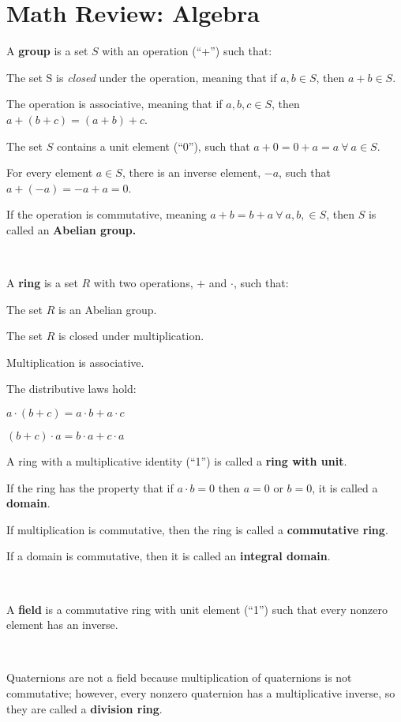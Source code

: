 \section{Math Review:  Algebra}

A {\bf group} is a set $S$ with an operation (``+'')  such that:

\qquad The set S is {\it closed} under the operation, meaning that if $a,b \in S$, then $a+b \in S$.

\qquad The operation is associative, meaning that if $a,b,c \in S$, then $a+(b+c) = (a+b)+c$.

\qquad The set $S$ contains a unit element (``0''), such that $a+0 = 0+a = a \ \forall \ a \in S.$

\qquad For every element $a \in S$, there is an inverse element, $-a$, such that $a+(-a) = -a + a = 0$.

If the operation is commutative, meaning $a+b = b+a \ \forall \ a, b, \in S$, then $S$ is called an {\bf Abelian group.}

\

A {\bf ring} is a set $R$ with two operations, $+$ and $\cdot$, such that:

\qquad The set $R$ is an Abelian group.  

\qquad The set $R$ is closed under multiplication.

\qquad Multiplication is associative.  

\qquad The distributive laws hold:

\qquad \qquad $a \cdot (b+c) = a \cdot b + a \cdot c$

\qquad \qquad $(b+c) \cdot a = b \cdot a + c \cdot a$

A ring with a multiplicative identity (``1'') is called a {\bf ring with unit}.

If the ring has the property that if $a\cdot b = 0$ then $a=0$ or $b=0$, it is called a {\bf domain}.

If multiplication is commutative, then the ring is called a {\bf commutative ring}.

If a domain is commutative, then it is called an {\bf integral domain}.

\

A {\bf field} is a commutative ring with unit element (``1'') such that every nonzero element has an inverse.  

\

Quaternions are not a field because multiplication of quaternions is not commutative; however, every nonzero quaternion has a multiplicative inverse, so they are called a {\bf division ring}.

